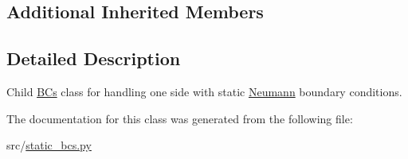 \subsection*{Additional Inherited Members}


\subsection{Detailed Description}
Child \hyperlink{namespaceMain__PDE__Repo_1_1src_1_1BCs}{B\+Cs} class for handling one side with static \hyperlink{classMain__PDE__Repo_1_1src_1_1static__bcs_1_1Neumann}{Neumann} boundary conditions. 



The documentation for this class was generated from the following file\+:\begin{DoxyCompactItemize}
\item 
src/\hyperlink{static__bcs_8py}{static\+\_\+bcs.\+py}\end{DoxyCompactItemize}
